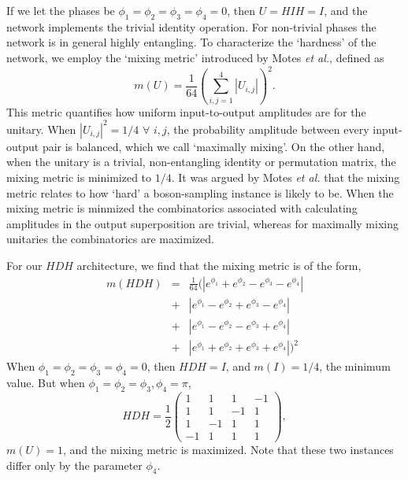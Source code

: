 \documentclass[aps,pra,twocolumn,amsmath,amssymb,nofootinbib,superscriptaddress]{revtex4}
\begin{document}
If we let the phases be $\phi_1=\phi_2=\phi_3=\phi_4=0$, then $U = HIH = I$, and the network implements the trivial identity operation. For non-trivial phases the network is in general highly entangling. To characterize the `hardness' of the network, we employ the `mixing metric' introduced by Motes \emph{et al.}, defined as
\begin{equation}
m(U) = \frac{1}{64} \left(\sum_{i,j=1}^4 |U_{i,j}|\right)^2.
\end{equation}
This metric quantifies how uniform input-to-output amplitudes are for the unitary. When $|U_{i,j}|^2 = 1/4 \,\,\forall\,\, i,j$, the probability amplitude between every input-output pair is balanced, which we call `maximally mixing'. On the other hand, when the unitary is a trivial, non-entangling identity or permutation matrix, the mixing metric is minimized to $1/4$. It was argued by Motes \emph{et al.} that the mixing metric relates to how `hard' a boson-sampling instance is likely to be. When the mixing metric is minmized the combinatorics associated with calculating amplitudes in the output superposition are trivial, whereas for maximally mixing unitaries the combinatorics are maximized.

For our $HDH$ architecture, we find that the mixing metric is of the form,
\begin{eqnarray}
m(HDH) &=& \frac{1}{64} (|e^{\phi_1}+e^{\phi_2}-e^{\phi_3}-e^{\phi_4}| \nonumber\\
&+& |e^{\phi_1}-e^{\phi_2}+e^{\phi_3}-e^{\phi_4}| \nonumber\\
&+& |e^{\phi_1}-e^{\phi_2}-e^{\phi_3}+e^{\phi_4}| \nonumber\\
&+& |e^{\phi_1}+e^{\phi_2}+e^{\phi_3}+e^{\phi_4}|)^2
\end{eqnarray}
When $\phi_1=\phi_2=\phi_3=\phi_4=0$, then $HDH = I$, and $m(I)=1/4$, the minimum value. But when $\phi_1=\phi_2=\phi_3, \phi_4=\pi$,
\begin{equation} \label{eq:max_mix_unitary}
HDH = \frac{1}{2} \left(\begin{array}{cccc}
1 & 1 & 1 & -1 \\
1 & 1 & -1 & 1 \\
1 & -1 & 1 & 1 \\
-1 & 1 & 1 & 1
\end{array}\right),
\end{equation}
$m(U) = 1$, and the mixing metric is maximized. Note that these two instances differ only by the parameter $\phi_4$.
\end{document}
